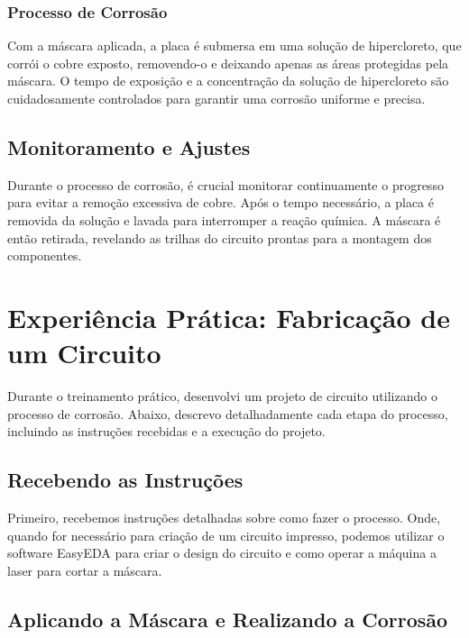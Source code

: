 \documentclass[
]{book}
\begin{document}
\subsubsection{Processo de Corrosão}\label{processo-de-corrosuxe3o-1}

Com a máscara aplicada, a placa é submersa em uma solução de hipercloreto, que corrói o cobre exposto, removendo-o e deixando apenas as áreas protegidas pela máscara. O tempo de exposição e a concentração da solução de hipercloreto são cuidadosamente controlados para garantir uma corrosão uniforme e precisa.

\subsection{Monitoramento e Ajustes}\label{monitoramento-e-ajustes}

Durante o processo de corrosão, é crucial monitorar continuamente o progresso para evitar a remoção excessiva de cobre. Após o tempo necessário, a placa é removida da solução e lavada para interromper a reação química. A máscara é então retirada, revelando as trilhas do circuito prontas para a montagem dos componentes.

\section{Experiência Prática: Fabricação de um Circuito}\label{experiuxeancia-pruxe1tica-fabricauxe7uxe3o-de-um-circuito}

Durante o treinamento prático, desenvolvi um projeto de circuito utilizando o processo de corrosão. Abaixo, descrevo detalhadamente cada etapa do processo, incluindo as instruções recebidas e a execução do projeto.

\subsection{Recebendo as Instruções}\label{recebendo-as-instruuxe7uxf5es-1}

Primeiro, recebemos instruções detalhadas sobre como fazer o processo. Onde, quando for necessário para criação de um circuito impresso, podemos utilizar o software EasyEDA para criar o design do circuito e como operar a máquina a laser para cortar a máscara.

\subsection{Aplicando a Máscara e Realizando a Corrosão}\label{aplicando-a-muxe1scara-e-realizando-a-corrosuxe3o}
\end{document}
